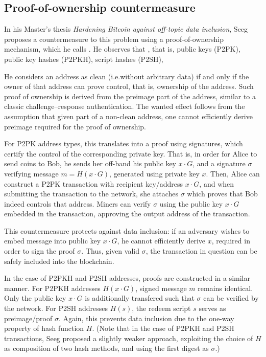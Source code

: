 \documentclass[10pt,a4paper,twocolumn]{article}
\begin{document}
\subsection{Proof-of-ownership countermeasure}

In his Master's thesis \emph{Hardening Bitcoin against off-topic data inclusion}, Seeg proposes a countermeasure to this problem using a proof-of-ownership mechanism, which he calls . 
He observes that , that is, public keys (P2PK), public key hashes (P2PKH), script hashes (P2SH), 

He considers an address as clean (i.e.\@ without arbitrary data) if and only if the owner of that address can prove control, that is, ownership of the address.
Such proof of ownership is derived from the  preimage part of the address, similar to a classic challenge–response authentication.
The wanted effect follows from the assumption that given  part of a non-clean address, one cannot efficiently derive  preimage required for the proof of ownership.

For P2PK address types, this translates into a proof using signatures, which certify the control of the corresponding private key.
That is, in order for Alice to send coins to Bob, he sends her off-band his public key $x\cdot G$, and a signature $\sigma$ verifying message $m=H(x\cdot G)$, generated using private key $x$.
Then, Alice can construct a P2PK transaction with recipient key/address $x\cdot G$, and when submitting the transaction to the network, she attaches $\sigma$ which proves that Bob indeed controls that address. 
Miners can verify $\sigma$ using the public key $x\cdot G$ embedded in the transaction, approving the output address of the transaction.

This countermeasure protects against data inclusion: if an adversary wishes to embed message into public key $x\cdot G$, he cannot efficiently derive $x$, required in order to sign the proof $\sigma$.
Thus, given valid $\sigma$, the transaction in question can be safely included into the blockchain.

In the case of P2PKH and P2SH addresses, proofs are constructed in a similar manner.
For P2PKH addresses $H(x\cdot G)$, signed message $m$ remains identical.
Only the public key $x\cdot G$ is additionally transfered such that $\sigma$ can be verified by the network.
For P2SH addresses $H(s)$, the redeem script $s$ serves as preimage/proof $\sigma$.
Again, this prevents data inclusion due to the one-way property of hash function $H$.
(Note that in the case of P2PKH and P2SH transactions, Seeg proposed a slightly weaker approach, exploiting the choice of $H$ as composition of two hash methods, and using the first digest as $\sigma$.)
\end{document}

